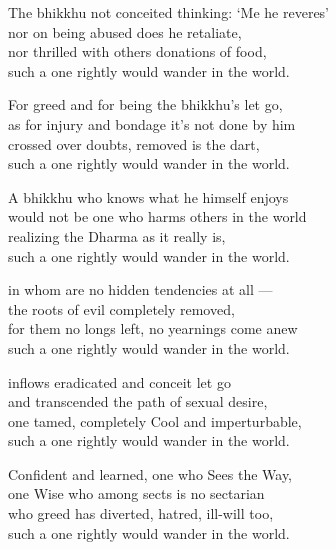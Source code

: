 \begin{MyDescription}{}
The bhikkhu not conceited thinking: `Me he reveres'\\
nor on being abused does he retaliate,\\
nor thrilled with others donations of food,\\
such a one rightly would wander in the world.
\end{MyDescription}

\begin{MyDescription}{}
For greed and for being the bhikkhu's let go,\\
as for injury and bondage it's not done by him\\
crossed over doubts, removed is the dart,\\
such a one rightly would wander in the world.
\end{MyDescription}

\begin{MyDescription}{}
A bhikkhu who knows what he himself enjoys\\
would not be one who harms others in the world\\
realizing the Dharma as it really is,\\
such a one rightly would wander in the world.
\end{MyDescription}

\begin{MyDescription}{}
in whom are no hidden tendencies at all —\\
the roots of evil completely removed,\\
for them no longs left, no yearnings come anew\\
such a one rightly would wander in the world.
\end{MyDescription}

\begin{MyDescription}{}
inﬂows eradicated and conceit let go\\
and transcended the path of sexual desire,\\
one tamed, completely Cool and imperturbable,\\
such a one rightly would wander in the world.
\end{MyDescription}

\begin{MyDescription}{}
Confident and learned, one who Sees the Way,\\
one Wise who among sects is no sectarian\\
who greed has diverted, hatred, ill-will too,\\
such a one rightly would wander in the world.
\end{MyDescription}

